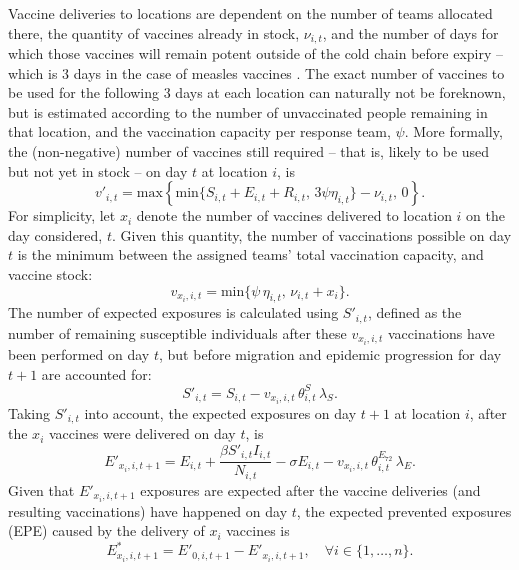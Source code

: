 \documentclass[10pt,letterpaper]{article}
\begin{document}
Vaccine deliveries to locations are dependent on the number of teams allocated there, the quantity of vaccines already in stock, $\nu_{i,t}$, and the number of days for which those vaccines will remain potent outside of the cold chain before expiry -- which is 3 days in the case of measles vaccines \cite{msf_ectc_2018}. The exact number of vaccines to be used for the following 3 days at each location can naturally not be foreknown, but is estimated according to the number of unvaccinated people remaining in that location, and the vaccination capacity per response team, $\psi$. More formally, the (non-negative) number of vaccines still required -- that is, likely to be used but not yet in stock --  on day $t$ at location $i$, is 
$$v'_{i,t} = \text{max} \left\{ \text{min} \{S_{i,t} + E_{i,t} + R_{i,t}, \, 3 \psi \eta_{i,t} \} - \nu_{i,t}, \, 0\right\}.$$
For simplicity, let $x_{i}$ denote the number of vaccines delivered to location $i$ on the day considered, $t$. Given this quantity, the number of vaccinations possible on day $t$ is the minimum between the assigned teams' total vaccination capacity, and vaccine stock: 
$$v_{x_{i},i,t} = \text{min} \{\psi \,\eta_{i,t}, \, \nu_{i,t} + x_{i} \}.$$ 
The number of expected exposures is calculated using $S'_{i,t}$, defined as the number of remaining susceptible individuals after these $v_{x_{i},i,t}$ vaccinations have been performed on day $t$, but before migration and epidemic progression for day $t+1$ are accounted for: $$S'_{i,t} = S_{i,t} - v_{x_{i},i,t} \, \theta^{S}_{i,t} \, \lambda_{S}.$$
Taking $S'_{i,t}$ into account, the expected exposures on day $t+1$ at location $i$, after the $x_{i}$ vaccines were delivered on day $t$, is
$$E'_{x_{i},i,t+1} = E_{i,t} + \frac{\beta S'_{i,t} I_{i,t}}{N_{i,t}} - \sigma E_{i,t} - v_{x_{i},i,t} \, \theta^{E_{72}}_{i,t} \, \lambda_{E}.$$
Given that $E'_{x_{i},i,t+1}$ exposures are expected after the vaccine deliveries (and resulting vaccinations) have happened on day $t$, the expected prevented exposures (EPE) caused by the delivery of $x_{i}$ vaccines is
$$E^{*}_{x_{i},i,t+1} = E'_{0,i,t+1} - E'_{x_{i},i,t+1}, \quad \forall{i} \in \{1, \dots, n \}.$$
\end{document}
